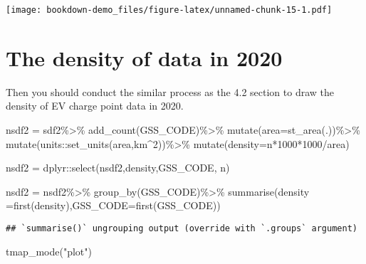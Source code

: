 \documentclass[
]{book}
\newenvironment{Shaded}{\begin{snugshade}}{\end{snugshade}}
\newcommand{\AttributeTok}[1]{\textcolor[rgb]{0.77,0.63,0.00}{#1}}
\newcommand{\DecValTok}[1]{\textcolor[rgb]{0.00,0.00,0.81}{#1}}
\newcommand{\FunctionTok}[1]{\textcolor[rgb]{0.00,0.00,0.00}{#1}}
\newcommand{\NormalTok}[1]{#1}
\newcommand{\OtherTok}[1]{\textcolor[rgb]{0.56,0.35,0.01}{#1}}
\newcommand{\SpecialCharTok}[1]{\textcolor[rgb]{0.00,0.00,0.00}{#1}}
\newcommand{\StringTok}[1]{\textcolor[rgb]{0.31,0.60,0.02}{#1}}
\begin{document}
\texttt{[image: bookdown-demo\_files/figure-latex/unnamed-chunk-15-1.pdf]}

\hypertarget{the-density-of-data-in-2020}{%
\section{The density of data in 2020}\label{the-density-of-data-in-2020}}

Then you should conduct the similar process as the 4.2 section to draw the density of EV charge point data in 2020.

\begin{Shaded}
\begin{Highlighting}[]
\NormalTok{nsdf2 }\OtherTok{=}\NormalTok{ sdf2}\SpecialCharTok{\%\textgreater{}\%}
  \FunctionTok{add\_count}\NormalTok{(GSS\_CODE)}\SpecialCharTok{\%\textgreater{}\%}
  \FunctionTok{mutate}\NormalTok{(}\AttributeTok{area=}\FunctionTok{st\_area}\NormalTok{(.))}\SpecialCharTok{\%\textgreater{}\%}
  \FunctionTok{mutate}\NormalTok{(units}\SpecialCharTok{::}\FunctionTok{set\_units}\NormalTok{(area,km}\SpecialCharTok{\^{}}\DecValTok{2}\NormalTok{))}\SpecialCharTok{\%\textgreater{}\%}
  \FunctionTok{mutate}\NormalTok{(}\AttributeTok{density=}\NormalTok{n}\SpecialCharTok{*}\DecValTok{1000}\SpecialCharTok{*}\DecValTok{1000}\SpecialCharTok{/}\NormalTok{area)}

\NormalTok{nsdf2 }\OtherTok{=}\NormalTok{ dplyr}\SpecialCharTok{::}\FunctionTok{select}\NormalTok{(nsdf2,density,GSS\_CODE, n)}

\NormalTok{nsdf2 }\OtherTok{=}\NormalTok{ nsdf2}\SpecialCharTok{\%\textgreater{}\%}                    
  \FunctionTok{group\_by}\NormalTok{(GSS\_CODE)}\SpecialCharTok{\%\textgreater{}\%}         
  \FunctionTok{summarise}\NormalTok{(}\AttributeTok{density =}\FunctionTok{first}\NormalTok{(density),}\AttributeTok{GSS\_CODE=}\FunctionTok{first}\NormalTok{(GSS\_CODE))}
\end{Highlighting}
\end{Shaded}

\begin{verbatim}
## `summarise()` ungrouping output (override with `.groups` argument)
\end{verbatim}

\begin{Shaded}
\begin{Highlighting}[]
\FunctionTok{tmap\_mode}\NormalTok{(}\StringTok{"plot"}\NormalTok{)}
\end{Highlighting}
\end{Shaded}
\end{document}
